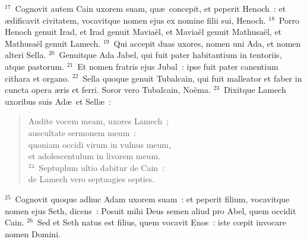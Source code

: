 ${}^{17}$~Cognovit autem Cain uxorem suam, qu\ae\ concepit, et peperit Henoch~: et \ae dificavit civitatem, vocavitque nomen ejus ex nomine filii sui, Henoch.
${}^{18}$~Porro Henoch genuit Irad, et Irad genuit Mavia\"el, et Mavia\"el genuit Mathusa\"el, et Mathusa\"el genuit Lamech.
${}^{19}$~Qui accepit duas uxores, nomen uni Ada, et nomen alteri Sella.
${}^{20}$~Genuitque Ada Jabel, qui fuit pater habitantium in tentoriis, atque pastorum.
${}^{21}$~Et nomen fratris ejus Jubal~: ipse fuit pater canentium cithara et organo.
${}^{22}$~Sella quoque genuit Tubalcain, qui fuit malleator et faber in cuncta opera \ae ris et ferri. Soror vero Tubalcain, No\"ema.
${}^{23}$~Dixitque Lamech uxoribus suis Ad\ae\ et Sell\ae~: \begin{verse}Audite vocem meam, uxores Lamech~;\\ auscultate sermonem meum~:\\ quoniam occidi virum in vulnus meum,\\ et adolescentulum in livorem meum.\\
${}^{24}$~Septuplum ultio dabitur de Cain~:\\ de Lamech vero septuagies septies.\end{verse}


${}^{25}$~Cognovit quoque adhuc Adam uxorem suam~: et peperit filium, vocavitque nomen ejus Seth, dicens~: Posuit mihi Deus semen aliud pro Abel, quem occidit Cain.
${}^{26}$~Sed et Seth natus est filius, quem vocavit Enos~: iste cœpit invocare nomen Domini.

